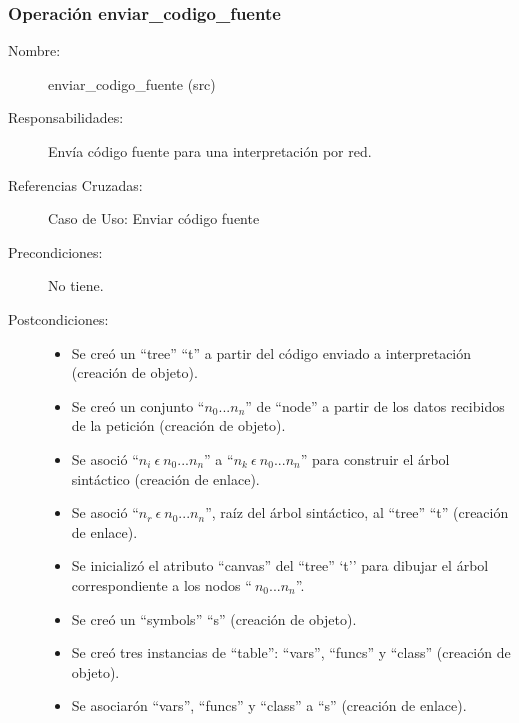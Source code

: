 \subsubsection{Operación enviar\_codigo\_fuente}
\FloatBarrier
\begin{framed}
	\begin{description}
		\item [Nombre:] enviar\_codigo\_fuente (src)
		\item [Responsabilidades:] Envía código fuente para una interpretación por red.
		\item [Referencias Cruzadas: ] Caso de Uso: Enviar código fuente
      \item [Precondiciones:] No tiene.
      \item [Postcondiciones:] \hfill
      \begin {itemize}
         \item Se creó un ``tree'' ``t'' a partir del código enviado a interpretación (creación de objeto).
         \item Se creó un conjunto ``$n_0...n_n$'' de ``node'' a partir de los datos recibidos de la petición (creación de objeto).
         \item Se asoció ``$n_i\ \epsilon\ n_0...n_n$'' a ``$n_k\ \epsilon\ n_0...n_n$'' para construir el árbol sintáctico (creación de enlace).
         \item Se asoció  ``$n_r\ \epsilon\ n_0...n_n$'', raíz del árbol sintáctico, al ``tree'' ``t'' (creación de enlace).
         \item Se inicializó el atributo ``canvas'' del ``tree'' `t'' para dibujar el árbol correspondiente a los nodos ``$\ n_0...n_n$''.
         \item Se creó un ``symbols'' ``s'' (creación de objeto).
         \item Se creó tres instancias de ``table'': ``vars'', ``funcs'' y ``class'' (creación de objeto).
         \item Se asociarón ``vars'', ``funcs'' y ``class'' a ``s'' (creación de enlace).
      \end{itemize}
	\end{description}
\end{framed}
\FloatBarrier

